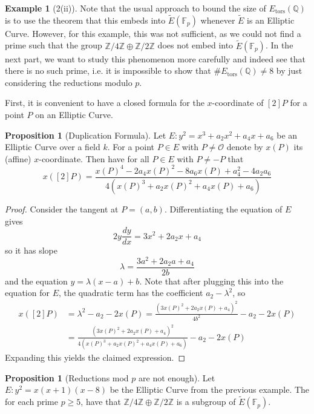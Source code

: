 \documentclass{scrartcl}
\newcommand{\Z}{\mathbb{Z}}
\newcommand{\F}{\mathbb{F}}
\newcommand{\Q}{\mathbb{Q}}
\renewcommand{\O}{\mathcal{O}}
\theoremstyle{definition}
\newtheorem{prop}[subsection]{Proposition}
\newtheorem{example}[subsection]{Example}
\begin{document}
\begin{example}[2(ii)]
    Note that the usual approach to bound the size of $E_{\mathrm{tors}}(\Q)$ is to use the theorem that this embeds into $\tilde{E}(\F_p)$ whenever $\tilde{E}$ is an Elliptic Curve.
    However, for this example, this was not sufficient, as we could not find a prime such that the group $\Z/4\Z \oplus \Z/2\Z$ does not embed into $\tilde{E}(\F_p)$.
    In the next part, we want to study this phenomenon more carefully and indeed see that there is no such prime, i.e. it is impossible to show that $\#E_{\mathrm{tors}}(\Q) \neq 8$ by just considering the reductions modulo $p$.
\end{example}
First, it is convenient to have a closed formula for the $x$-coordinate of $[2]P$ for a point $P$ on an Elliptic Curve.
\begin{prop}[Duplication Formula]
    \label{prop:duplication_formula}
    Let $E: y^2 = x^3 + a_2 x^2 + a_4 x + a_6$ be an Elliptic Curve over a field $k$.
    For a point $P \in E$ with $P \neq \O$ denote by $x(P)$ its (affine) $x$-coordinate.
    Then have for all $P \in E$ with $P \neq -P$ that
    \begin{equation*}
        x([2]P) = \frac {x(P)^4 - 2a_4 x(P)^2 - 8a_6x(P) + a_4^2 - 4a_2a_6} {4(x(P)^3 + a_2 x(P)^2 + a_4 x(P) + a_6)}
    \end{equation*}  
\end{prop}
\begin{proof}
    Consider the tangent at $P = (a, b)$.
    Differentiating the equation of $E$ gives
    \begin{equation*}
        2y\frac {dy} {dx} = 3x^2 + 2a_2x + a_4
    \end{equation*}
    so it has slope
    \begin{equation*}
        \lambda = \frac {3a^2 + 2a_2a + a_4} {2b}
    \end{equation*}
    and the equation $y = \lambda (x - a) + b$.
    Note that after plugging this into the equation for $E$, the quadratic term has the coefficient $a_2 - \lambda^2$, so
    \begin{align*}
        x([2]P) &= \lambda^2 - a_2 - 2 x(P) = \frac {(3x(P)^2 + 2a_2x(P) + a_4)^2} {4b^2} - a_2 - 2 x(P) \\
        &= \frac {(3x(P)^2 + 2a_2x(P) + a_4)^2} {4(x(P)^3 + a_2 x(P)^2 + a_4 x(P) + a_6)} - a_2 - 2 x(P)
    \end{align*}
    Expanding this yields the claimed expression.
\end{proof}
\begin{prop}[Reductions mod $p$ are not enough]
    \label{prop:subgroup_mod_every_p}
    Let $E: y^2 = x(x + 1)(x - 8)$ be the Elliptic Curve from the previous example.
    The for each prime $p \geq 5$, have that $\Z/4\Z \oplus \Z/2\Z$ is a subgroup of $\tilde{E}(\F_p)$.
\end{prop}
\end{document}

